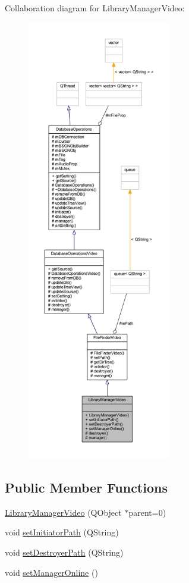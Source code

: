 Collaboration diagram for Library\-Manager\-Video\-:
\nopagebreak
\begin{figure}[H]
\begin{center}
\leavevmode
\includegraphics[height=550pt]{class_library_manager_video__coll__graph}
\end{center}
\end{figure}
\subsection*{Public Member Functions}
\begin{DoxyCompactItemize}
\item 
\hyperlink{class_library_manager_video_aaa8e91329f88803b80f2a723954b1188}{Library\-Manager\-Video} (Q\-Object $\ast$parent=0)
\item 
void \hyperlink{class_library_manager_video_a8c448f4da0f3e7b1a821086c45597849}{set\-Initiator\-Path} (Q\-String)
\item 
void \hyperlink{class_library_manager_video_a0a3a3f2221264821f29c4a028dac3334}{set\-Destroyer\-Path} (Q\-String)
\item 
void \hyperlink{class_library_manager_video_ae1883a1f0fa0d98781678e6da2c38f63}{set\-Manager\-Online} ()
\end{DoxyCompactItemize}
